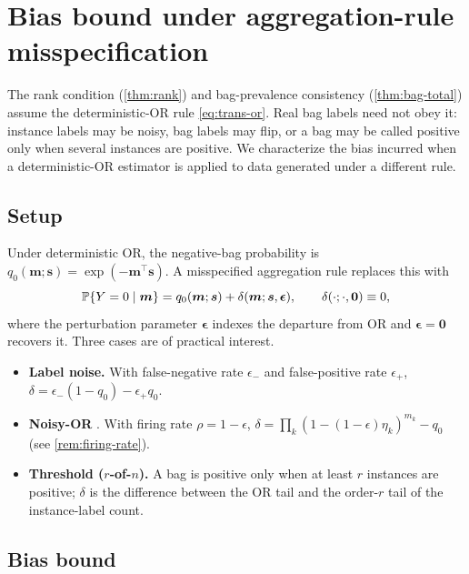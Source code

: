 \section{Bias bound under aggregation-rule misspecification}
\label{sec:methodology}

The rank condition (\cref{thm:rank}) and bag-prevalence consistency
(\cref{thm:bag-total}) assume the deterministic-OR rule
\eqref{eq:trans-or}. Real bag labels need not obey it: instance
labels may be noisy, bag labels may flip, or a bag may be called
positive only when several instances are positive. We characterize
the bias incurred when a deterministic-OR estimator is applied to
data generated under a different rule.

\subsection{Setup}

Under deterministic OR, the negative-bag probability is
$q_0(\bm{m};\bm{s}) = \exp(-\bm{m}^\top\bm{s})$. A misspecified
aggregation rule replaces this with
\begin{equation}
  \mathbb{P}\{Y = 0 \mid \bm{m}\}
  = q_0(\bm{m};\bm{s}) + \delta(\bm{m};\bm{s},\bm{\epsilon}),
  \qquad \delta(\cdot;\cdot,\bm{0}) \equiv 0,
  \label{eq:meth-delta}
\end{equation}
where the perturbation parameter $\bm{\epsilon}$ indexes the
departure from OR and $\bm{\epsilon} = \bm{0}$ recovers it. Three
cases are of practical interest.
\begin{itemize}
\item \textbf{Label noise.} With false-negative rate $\epsilon_-$
  and false-positive rate $\epsilon_+$,
  $\delta = \epsilon_-(1 - q_0) - \epsilon_+ q_0$.
\item \textbf{Noisy-OR} \citep{pearl1988probabilistic}. With firing
  rate $\rho = 1 - \epsilon$,
  $\delta = \prod_k (1 - (1-\epsilon)\eta_k)^{m_k} - q_0$
  (see \cref{rem:firing-rate}).
\item \textbf{Threshold ($r$-of-$n$).} A bag is positive only when
  at least $r$ instances are positive; $\delta$ is the difference
  between the OR tail and the order-$r$ tail of the instance-label
  count.
\end{itemize}

\subsection{Bias bound}

